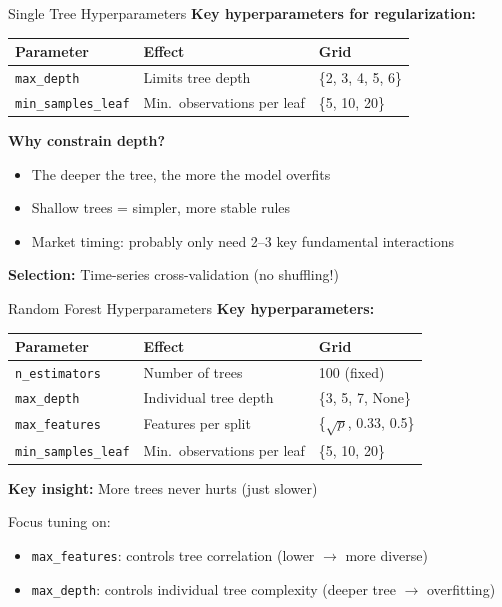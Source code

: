 \documentclass[10pt]{beamer}
\begin{document}
\begin{frame}{Single Tree Hyperparameters}
  \textbf{Key hyperparameters for regularization:}

  \vspace{0.5em}
  \begin{tabular}{lll}
    \toprule
    \textbf{Parameter} & \textbf{Effect} & \textbf{Grid} \\
    \midrule
    \texttt{max\_depth} & Limits tree depth & \{2, 3, 4, 5, 6\} \\
    \texttt{min\_samples\_leaf} & Min.\ observations per leaf & \{5, 10, 20\} \\
    \bottomrule
  \end{tabular}

  \vspace{1em}
  \textbf{Why constrain depth?}
  \begin{itemize}
    \item The deeper the tree, the more the model overfits
    \item Shallow trees = simpler, more stable rules
    \item Market timing: probably only need 2--3 key fundamental interactions
  \end{itemize}

  \vspace{0.5em}
  \textbf{Selection:} Time-series cross-validation (no shuffling!)
\end{frame}


\begin{frame}{Random Forest Hyperparameters}
  \textbf{Key hyperparameters:}

  \vspace{0.3em}
  \begin{tabular}{lll}
    \toprule
    \textbf{Parameter} & \textbf{Effect} & \textbf{Grid} \\
    \midrule
    \texttt{n\_estimators} & Number of trees & 100 (fixed) \\
    \texttt{max\_depth} & Individual tree depth & \{3, 5, 7, None\} \\
    \texttt{max\_features} & Features per split & \{$\sqrt{p}$, 0.33, 0.5\} \\
    \texttt{min\_samples\_leaf} & Min.\ observations per leaf & \{5, 10, 20\} \\
    \bottomrule
  \end{tabular}

  \vspace{0.5em}
  \textbf{Key insight:} More trees never hurts (just slower)

  \vspace{0.3em}
  Focus tuning on:
  \begin{itemize}
    \item \texttt{max\_features}: controls tree correlation (lower $\to$ more diverse)
    \item \texttt{max\_depth}: controls individual tree complexity (deeper tree $\to$ overfitting)
  \end{itemize}
\end{frame}
\end{document}
